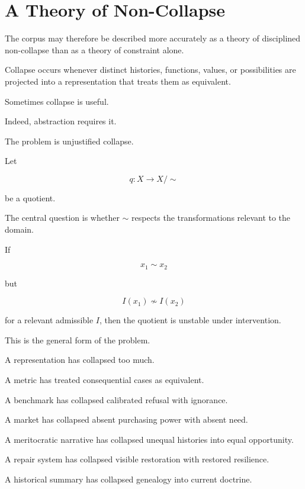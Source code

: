 \documentclass[11pt]{article}
\theoremstyle{remark}
\begin{document}
\section{A Theory of Non-Collapse}

The corpus may therefore be described more accurately as a theory of disciplined non-collapse than as a theory of constraint alone.

Collapse occurs whenever distinct histories, functions, values, or possibilities are projected into a representation that treats them as equivalent.

Sometimes collapse is useful.

Indeed, abstraction requires it.

The problem is unjustified collapse.

Let

\begin{equation}
q:X\rightarrow X/{\sim}
\end{equation}

be a quotient.

The central question is whether $\sim$ respects the transformations relevant to the domain.

If

\begin{equation}
x_1\sim x_2
\end{equation}

but

\begin{equation}
I(x_1)\not\sim I(x_2)
\end{equation}

for a relevant admissible $I$, then the quotient is unstable under intervention.

This is the general form of the problem.

A representation has collapsed too much.

A metric has treated consequential cases as equivalent.

A benchmark has collapsed calibrated refusal with ignorance.

A market has collapsed absent purchasing power with absent need.

A meritocratic narrative has collapsed unequal histories into equal opportunity.

A repair system has collapsed visible restoration with restored resilience.

A historical summary has collapsed genealogy into current doctrine.
\end{document}
